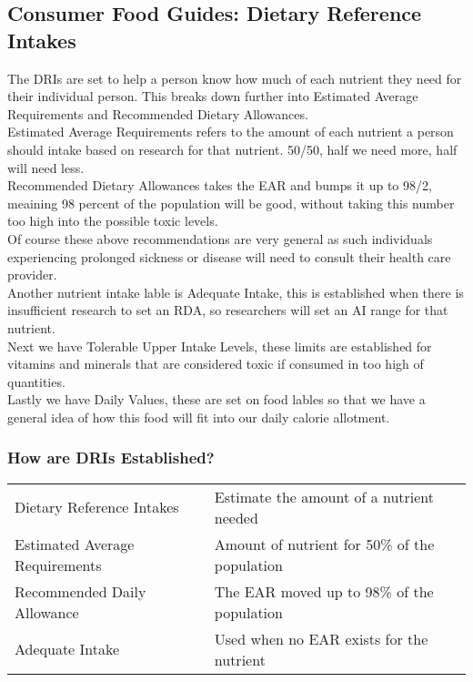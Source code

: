 \documentclass[letterpaper, 11pt]{article}
\begin{document}
\subsection{Consumer Food Guides: Dietary Reference Intakes}
\label{sec:orgec928b5}
The DRIs are set to help a person know how much of each nutrient they need for their individual person. This breaks down further into Estimated Average Requirements and Recommended Dietary Allowances.\\
Estimated Average Requirements refers to the amount of each nutrient a person should intake based on research for that nutrient. 50/50, half we need more, half will need less.\\
Recommended Dietary Allowances takes the EAR and bumps it up to 98/2, meaining 98 percent of the population will be good, without taking this number too high into the possible toxic levels.\\
Of course these above recommendations are very general as such individuals experiencing prolonged sickness or disease will need to consult their health care provider.\\
Another nutrient intake lable is Adequate Intake,  this is established when there is insufficient research to set an RDA, so researchers will set an AI range for that nutrient.\\
Next we have Tolerable Upper Intake Levels,  these limits are established for vitamins and minerals that are considered toxic if consumed in too high of quantities.\\
Lastly we have Daily Values, these are set on food lables so that we have a general idea of how this food will fit into our daily calorie allotment.\\
\subsubsection{How are DRIs Established?}
\label{sec:org8677730}
\begin{center}
\begin{tabular}{ll}
Dietary Reference Intakes & Estimate the amount of a nutrient needed\\
Estimated Average Requirements & Amount of nutrient for 50\% of the population\\
Recommended Daily Allowance & The EAR moved up to 98\% of the population\\
Adequate Intake & Used when no EAR exists for the nutrient\\
\end{tabular}
\end{center}
\end{document}
